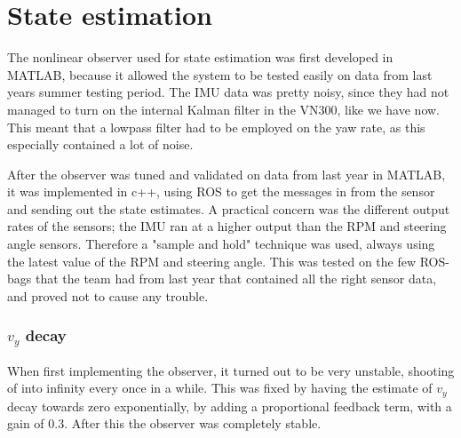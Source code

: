 \section{State estimation}

The nonlinear observer used for state estimation was first developed in MATLAB, because it allowed the system to be tested easily on data from last years summer testing period. The IMU data was pretty noisy, since they had not managed to turn on the internal Kalman filter in the VN300, like we have now. This meant that a lowpass filter had to be employed on the yaw rate, as this especially contained a lot of noise. 

After the observer was tuned and validated on data from last year in MATLAB, it was implemented in c++, using ROS to get the messages in from the sensor and sending out the state estimates. A practical concern was the different output rates of the sensors; the IMU ran at a higher output than the RPM and steering angle sensors. Therefore a "sample and hold" technique was used, always using the latest value of the RPM and steering angle. This was tested on the few ROS-bags that the team had from last year that contained all the right sensor data, and proved not to cause any trouble.  

\subsubsection{$v_y$ decay}

When first implementing the observer, it turned out to be very unstable, shooting of into infinity every once in a while. This was fixed by having the estimate of $v_y$ decay towards zero exponentially, by adding a proportional feedback term, with a gain of $0.3$. After this the observer was completely stable.